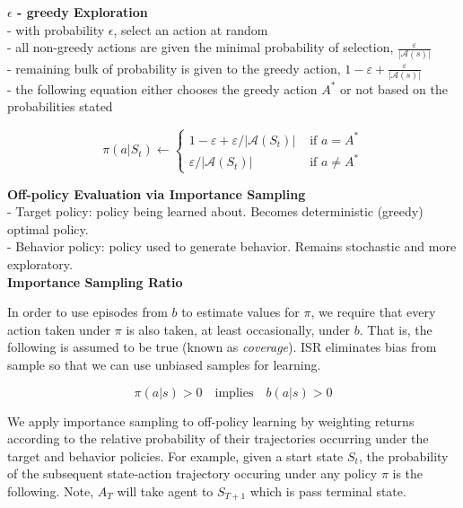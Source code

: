 \documentclass{article}
\begin{document}
\noindent
\textbf{$\epsilon$ - greedy Exploration}\\
- with probability $\epsilon$, select an action at random\\
- all non-greedy actions are given the minimal probability of selection, $\frac{\varepsilon}{|\mathcal{A}(s)|}$\\
- remaining bulk of probability is given to the greedy action,
$1-\varepsilon+\frac{\varepsilon}{|\mathcal{A}(s)|}$ \\
- the following equation either chooses the greedy action $A^{*}$ or not based on
the probabilities stated

\begin{equation}
\pi\left(a | S_{t}\right) \leftarrow\left\{\begin{array}{ll}
1-\varepsilon+\varepsilon /\left|\mathcal{A}\left(S_{t}\right)\right| & \text { if } a=A^{*} \\
\varepsilon /\left|\mathcal{A}\left(S_{t}\right)\right| & \text { if } a \neq A^{*}
\end{array}\right.
\end{equation}

\noindent
\textbf{Off-policy Evaluation via Importance Sampling}\\
- Target policy: policy being learned about. Becomes deterministic (greedy)
optimal policy.\\
- Behavior policy: policy used to generate behavior. Remains stochastic and more
exploratory.\\

\noindent
\textbf{Importance Sampling Ratio}

\noindent
In order to use episodes from $b$ to estimate values for $\pi$, we require that
every action taken under $\pi$ is also taken, at least occasionally, under $b$.
That is, the following is assumed to be true (known as \textit{coverage}). ISR
eliminates bias from sample so that we can use unbiased samples for learning.

\begin{equation}
\pi(a | s) > 0 \quad \text{implies} \quad b(a|s) > 0
\end{equation}

\noindent
We apply importance sampling to off-policy learning by weighting returns
according to the relative probability of their trajectories occurring under the
target and behavior policies. For example, given a start state $S_{t}$, the
probability of the subsequent state-action trajectory occuring under any policy
$\pi$ is the following. Note, $A_{T}$ will take agent to $S_{T+1}$ which is pass
terminal state.
\end{document}
